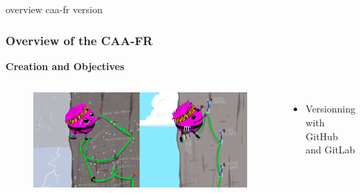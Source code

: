 \documentclass[t,aspectratio=169,xcolor=dvipsnames]{beamer}
\begin{document}
\begin{frame}{overview caa-fr version}

    \frametitle{Overview of the CAA-FR} 

    \begin{block}{\textbf{Creation and Objectives}} %
    \end{block}

    \begin{columns}[t]
    	
    	
    	\begin{figure}
    		\includegraphics[height=0.48\textheight]{figures/github_compare_text.png}
    	\end{figure}
    	
    	
    	\begin{itemize}
    		\item Versionning with GitHub and GitLab
    	\end{itemize}
    	
    \end{columns}

    \end{frame}

\end{document}
